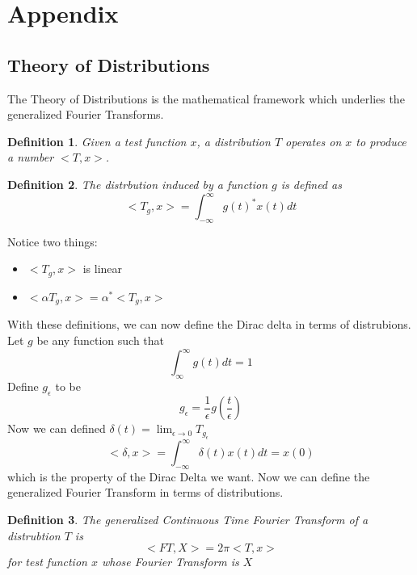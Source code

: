\documentclass{article}
\newtheorem{definition}{Definition}
\begin{document}
\section{Appendix}
\subsection{Theory of Distributions}
The Theory of Distributions is the mathematical framework which underlies the generalized Fourier Transforms.
\begin{definition}
    Given a test function $x$, a distribution $T$ operates on $x$ to produce a number $<T,x>$.
\end{definition}
\begin{definition}
    The distrbution induced by a function $g$ is defined as
    $$<T_g, x> = \int_{-\infty}^{\infty}{g(t)^*x(t)dt}$$
\end{definition}
Notice two things:
\begin{itemize}
    \item $<T_g, x>$ is linear
    \item $<\alpha T_g, x> = \alpha^*<T_g, x>$
\end{itemize}
With these definitions, we can now define the Dirac delta in terms of distrubions.
Let $g$ be any function such that
$$\int_{\infty}^{\infty}{g(t)dt} = 1$$
Define $g_\epsilon$ to be
$$g_\epsilon = \frac{1}{\epsilon}g(\frac{t}{\epsilon})$$
Now we can defined $\delta(t) = \lim_{\epsilon \rightarrow 0}{T_{g_\epsilon}}$
$$<\delta, x> = \int_{-\infty}^{\infty}{\delta(t)x(t)dt} = x(0)$$ 
which is the property of the Dirac Delta we want. Now we can define the generalized Fourier Transform
in terms of distributions.
\begin{definition}
    The generalized Continuous Time Fourier Transform of a distrubtion $T$ is
    $$<FT, X> = 2\pi<T, x>$$
    for test function $x$ whose Fourier Transform is $X$
\end{definition}
\end{document}
